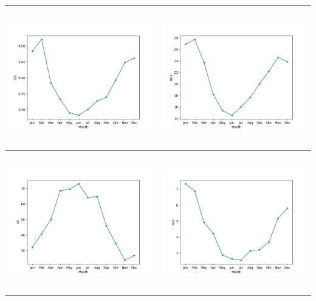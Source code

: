 \documentclass[18pt, letterpaper]{article}
\begin{document}
\begin{table}[H]
\centering
\begin{tabular}{|c|c|}
\hline
\includegraphics[width=80mm,height=60mm]{visualisations/cycles/monthly_CO.png}  & \includegraphics[width=80mm,height=60mm]{visualisations/cycles/monthly_NO2.png} \\ \hline
\includegraphics[width=80mm,height=60mm]{visualisations/cycles/monthly_O3.png}  & \includegraphics[width=80mm,height=60mm]{visualisations/cycles/monthly_SO2.png} \\ \hline

\end{tabular}
\end{table}
\end{document}
